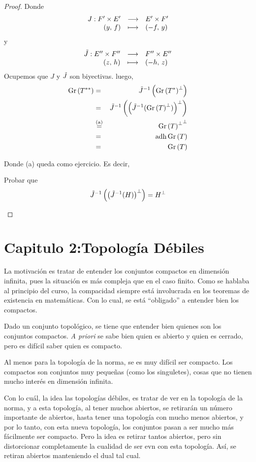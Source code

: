 \begin{proof}
Donde $$
\begin{array}{rcl} J : F' \times E' & \longrightarrow & E' \times F' \\ (y,\, f) & \longmapsto & (-f,\, y) \end{array}
$$ y $$
\begin{array}{rcl} \Tilde{J} : E'' \times F'' & \longrightarrow & F'' \times E'' \\ (z,\, h) & \longmapsto & (-h,\, z) \end{array}
$$ Ocupemos que $J$ y $\Tilde{J}$ son biyectivas. luego, 
\begin{eqnarray}
\operatorname{\mathop{\text{\upshape{Gr}}}}{({T}^{**})} 
&=& {\Tilde{J}}^{-1} \left( {\operatorname{\mathop{\text{\upshape{Gr}}}}{({T}^{*})}}^{\perp} \right) \\
&=& {\Tilde{J}}^{-1} \left( {\left( {\Tilde{J}}^{-1}  ({\operatorname{\mathop{\text{\upshape{Gr}}}}{(T)}}^{\perp}) \right)}^{\perp} \right) \\
&\overset{\text{(a)}}{=}& {{\operatorname{\mathop{\text{\upshape{Gr}}}}{(T)}}^{\perp}}^{\perp} \\
&=& \operatorname{\mathop{\text{\upshape{adh}}}} \operatorname{\mathop{\text{\upshape{Gr}}}}{(T)} \\
&=& \operatorname{\mathop{\text{\upshape{Gr}}}}{(T)} 
\end{eqnarray}

Donde (a) queda como ejercicio. Es decir, 
\begin{exer}
Probar que $$
{\Tilde{J}}^{-1} \left( {\left( {\Tilde{J}}^{-1}  (H) \right)}^{\perp} \right) = {H}^{\perp}
$$
\end{exer}

\end{proof}

\section{Capitulo 2:Topología Débiles}

La motivación es tratar de entender los conjuntos compactos en dimensión infinita, pues la situación es más compleja que en el caso finito. Como se hablaba al principio del curso, la compacidad siempre está involucrada en los teoremas de existencia en matemáticas. Con lo cual, se está ``obligado'' a entender bien los compactos.

Dado un conjunto topológico, se tiene que entender bien quienes son los conjuntos compactos. \textit{A priori} se sabe bien quien es abierto y quien es cerrado, pero es difícil saber quien es compacto. 

Al menos para la topología de la norma, se es muy difícil ser compacto. Los compactos son conjuntos muy pequeñas (como los singuletes), cosas que no tienen mucho interés en dimensión infinita.

Con lo cuál, la idea las topologías débiles, es tratar de ver en la topología de la norma, y a esta topología, al tener muchos abiertos, se retirarán un número importante de abiertos, hasta tener una topología con mucho menos abiertos, y por lo tanto, con esta nueva topología, los conjuntos pasan a ser mucho más fácilmente ser compacto. Pero la idea es retirar tantos abiertos, pero sin distorcionar completamente la cualidad de ser evn con esta topología. Así, se retiran abiertos manteniendo el dual tal cual.

